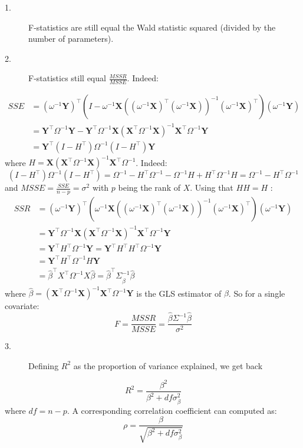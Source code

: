 \documentclass[12pt]{article}
\newcommand\trans[1]{{#1}^\intercal}%
\newcommand\VY{\mathbf{Y}}
\newcommand\VX{\mathbf{X}}
\begin{document}
\begin{description}
\item[{1.}] F-statistics are still equal the Wald statistic squared
(divided by the number of parameters).
\item[{2.}] F-statistics still equal \(\frac{MSSR}{MSSE}\). Indeed:
\end{description}
\begin{align*}
SSE &= \trans{\left(\omega^{-1}\VY\right)}\left(I-\omega^{-1}\VX\left(\trans{\left(\omega^{-1}\VX\right)}\left(\omega^{-1}\VX\right)\right)^{-1} \trans{\left(\omega^{-1}\VX\right)}\right)\left(\omega^{-1}\VY\right) \\
&= \trans{\VY} \Omega^{-1} \VY - \trans{\VY} \Omega^{-1} \VX \left(\trans{\VX}\Omega^{-1}\VX\right)^{-1} \trans{\VX} \Omega^{-1} \VY  \\
&= \trans{\VY} (I-\trans{H})\Omega^{-1} (I-\trans{H}) \VY
\end{align*}
where \(H = \VX \left(\trans{\VX}\Omega^{-1} \VX \right)^{-1}
\trans{\VX} \Omega^{-1}\). Indeed:
\[ (I-\trans{H})\Omega^{-1}
(I-\trans{H})= \Omega^{-1} - \trans{H}\Omega^{-1} - \Omega^{-1} H +
\trans{H}\Omega^{-1}H = \Omega^{-1} - \trans{H}\Omega^{-1} \]
and \(MSSE = \frac{SSE}{n-p} = \sigma^2\) with \(p\) being the rank
of \(X\). Using that \(HH=H\) :
\begin{align*}
SSR &= \trans{\left(\omega^{-1}\VY\right)}\left(\omega^{-1}\VX\left(\trans{\left(\omega^{-1}\VX\right)}\left(\omega^{-1}\VX\right)\right)^{-1} \trans{\left(\omega^{-1}\VX\right)}\right)\left(\omega^{-1}\VY\right) \\
&= \trans{\VY} \Omega^{-1} \VX \left(\trans{\VX}\Omega^{-1}\VX\right)^{-1} \trans{\VX} \Omega^{-1} \VY  \\
&= \trans{\VY} \trans{H} \Omega^{-1} \VY = \trans{\VY} \trans{H}\trans{H} \Omega^{-1} \VY  \\
&= \trans{\VY} \trans{H} \Omega^{-1} H \VY \\
&= \trans{\widehat{\beta}} \trans{X} \Omega^{-1} X \widehat{\beta}  = \trans{\widehat{\beta}} \Sigma^{-1}_{\widehat{\beta}} \widehat{\beta} 
\end{align*}
where \(\widehat{\beta} = \left(\trans{\VX}\Omega^{-1} \VX
\right)^{-1}\trans{\VX} \Omega^{-1}\VY\) is the GLS estimator of
\(\beta\). So for a single covariate: 
\[ F=\frac{MSSR}{MSSE}=\frac{\widehat{\beta}\Sigma^{-1}\widehat{\beta}}{\sigma^2} \]

\begin{description}
\item[{3.}] Defining \(R^2\) as the proportion of variance explained, we get back
\end{description}
\[ R^2 = \frac{\beta^2}{\beta^2 + df \sigma^2_{\beta} } \]
where \(df=n-p\). A corresponding correlation coefficient can computed as:
\[ \rho = \frac{\beta}{\sqrt{\beta^2 + df \sigma^2_{\beta}} } \]
\end{document}
